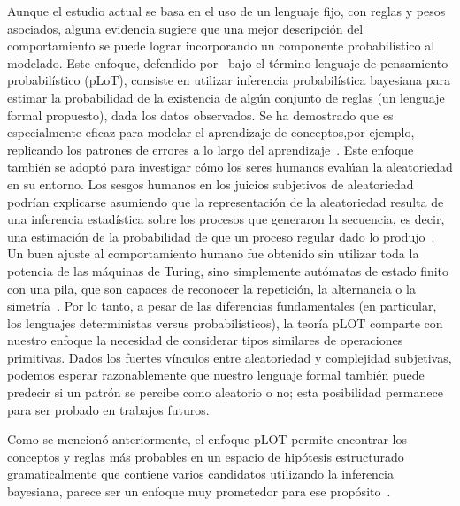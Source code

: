Aunque el estudio actual se basa en el uso de un lenguaje fijo, con reglas y pesos asociados, alguna evidencia sugiere que una mejor descripción del comportamiento se puede lograr incorporando un componente probabilístico al modelado. Este enfoque, defendido por~\cite{piantadosi2016four} bajo el término lenguaje de pensamiento probabilístico (pLoT), consiste en utilizar inferencia probabilística bayesiana para estimar la probabilidad de la existencia de algún conjunto de reglas (un lenguaje formal propuesto), dada los datos observados. Se ha demostrado que es especialmente eficaz para modelar el aprendizaje de conceptos,por ejemplo, replicando los patrones de errores a lo largo del aprendizaje~\cite{goodman2008rational,piantadosi2012bootstrapping,piantadosi2016logical}. Este enfoque también se adoptó para investigar cómo los seres humanos evalúan la aleatoriedad en su entorno. Los sesgos humanos en los juicios subjetivos de aleatoriedad~\cite{f114,f115} podrían explicarse asumiendo que la representación de la aleatoriedad resulta de una inferencia estadística sobre los procesos que generaron la secuencia, es decir, una estimación de la probabilidad de que un proceso regular dado lo produjo~\cite{f21}. Un buen ajuste al comportamiento humano fue obtenido sin utilizar toda la potencia de las máquinas de Turing, sino simplemente autómatas de estado finito con una pila, que son capaces de reconocer la repetición, la alternancia o la simetría~\cite{f18,f117}. Por lo tanto, a pesar de las diferencias fundamentales (en particular, los lenguajes deterministas versus probabilísticos), la teoría pLOT comparte con nuestro enfoque la necesidad de considerar tipos similares de operaciones primitivas. Dados los fuertes vínculos entre aleatoriedad y complejidad subjetivas, podemos esperar razonablemente que nuestro lenguaje formal también puede predecir si un patrón se percibe como aleatorio o no; esta posibilidad permanece para ser probado en trabajos futuros.

Como se mencionó anteriormente, el enfoque pLOT permite encontrar los conceptos y reglas más probables en un espacio de hipótesis estructurado gramaticalmente que contiene varios candidatos utilizando la inferencia bayesiana, parece ser un enfoque muy prometedor para ese propósito~\cite{goodman2008rational,piantadosi2016four,romano2018bayesian}. 
